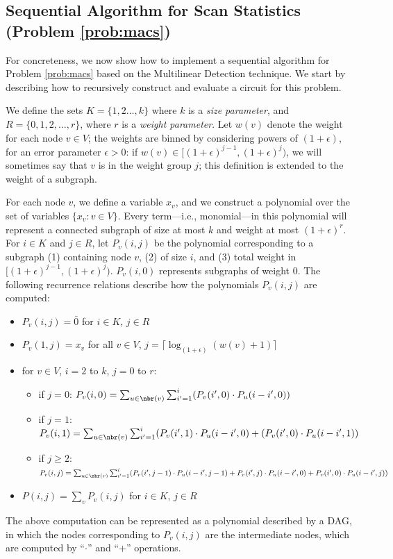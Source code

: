 
\subsection{Sequential Algorithm for Scan Statistics (Problem \ref{prob:macs})}
For concreteness, we now show how to implement a sequential algorithm for Problem \ref{prob:macs} based on the Multilinear Detection technique. We start by describing how to recursively construct and evaluate a circuit for this problem.

We define the sets $K=\{1,2 \ldots, k\}$ where $k$ is a \emph{size parameter}, and $R=\{0,1,2,\ldots, r\}$, where $r$ is a \emph{weight parameter}. Let $w(v)$ denote the weight for each node $v\in V$; the weights are binned by considering powers of $(1+\epsilon)$, for an error parameter $\epsilon>0$: if $w(v)\in [(1+ \epsilon)^{j-1}, (1+ \epsilon)^{j})$, we will sometimes say that $v$ is in the weight group $j$; this definition is extended to the weight of a subgraph.

For each node $v$, we define a variable $x_v$, and we construct a polynomial over the set of variables $\{x_v: v \in V\}$. Every term---i.e., monomial---in this polynomial will represent a connected subgraph of size at most $k$ and weight at most $(1+ \epsilon)^r$.
For $i \in K$ and $j \in R$, let $P_v(i,j)$ be the polynomial corresponding to a subgraph (1) containing node $v$, (2) of size $i$, and (3) total weight in
$[(1+ \epsilon)^{j-1}, (1+ \epsilon)^{j})$. $P_v(i,0)$ represents subgraphs of weight 0.
The following recurrence relations describe how the polynomials $P_v(i, j)$ are computed:
\begin{itemize}
\item
$P_v(i, j) = \bar{0}$ for $i \in K$, $j \in R$
\item
$P_v(1, j) = x_v$ for all $v \in V$, $j = \lceil \log_{(1 + \epsilon)} (w(v) + 1)\rceil$
\item
for $v \in V$, $i = 2$ to $k$, $j = 0$ to $r$:
\begin{itemize}
\item
if $j=0$: $P_v(i,0) = \sum_{u \in \nbr(v)} \sum_{i' = 1}^i (P_v(i',0) \cdot P_u(i-i', 0))$
\item
if $j=1$:
$P_v(i,1) = \sum_{u \in \nbr(v)} \sum_{i' = 1}^i (P_v(i', 1) \cdot P_u(i-i', 0) + (P_v(i', 0) \cdot P_u(i-i', 1))$
\item
if $j\geq 2$:
$P_v(i,j) = \sum_{u \in \nbr(v)} \sum_{i' = 1}^i (P_v(i', j - 1) \cdot P_u(i-i', j - 1) +
P_v(i', j) \cdot P_u(i-i', 0) + P_v(i', 0) \cdot P_u(i-i', j))$
\end{itemize}
\item
$P(i,j) = \sum_v P_v(i,j)$ for $i \in K$, $j \in R$
\end{itemize}
The above computation can be represented as a polynomial described by a DAG, in which the
nodes corresponding to $P_v(i, j)$ are the intermediate nodes, which are computed by ``$\cdot$'' and ``$+$''
operations.

